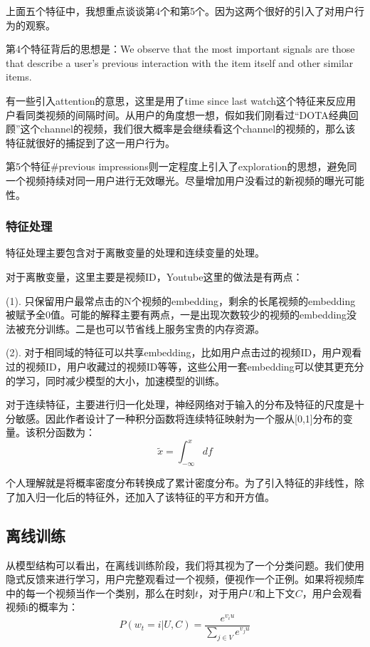 \documentclass[12pt]{article}
\begin{document}
上面五个特征中，我想重点谈谈第4个和第5个。因为这两个很好的引入了对用户行为的观察。

第4个特征背后的思想是：We observe that the most important signals are those that describe a user's previous interaction with the item itself and other similar items.

有一些引入attention的意思，这里是用了time since last watch这个特征来反应用户看同类视频的间隔时间。从用户的角度想一想，假如我们刚看过“DOTA经典回顾”这个channel的视频，我们很大概率是会继续看这个channel的视频的，那么该特征就很好的捕捉到了这一用户行为。

第5个特征\#previous impressions则一定程度上引入了exploration的思想，避免同一个视频持续对同一用户进行无效曝光。尽量增加用户没看过的新视频的曝光可能性。

\subsubsection{特征处理}
特征处理主要包含对于离散变量的处理和连续变量的处理。

对于离散变量，这里主要是视频ID，Youtube这里的做法是有两点：

(1). 只保留用户最常点击的N个视频的embedding，剩余的长尾视频的embedding被赋予全0值。可能的解释主要有两点，一是出现次数较少的视频的embedding没法被充分训练。二是也可以节省线上服务宝贵的内存资源。

(2). 对于相同域的特征可以共享embedding，比如用户点击过的视频ID，用户观看过的视频ID，用户收藏过的视频ID等等，这些公用一套embedding可以使其更充分的学习，同时减少模型的大小，加速模型的训练。


对于连续特征，主要进行归一化处理，神经网络对于输入的分布及特征的尺度是十分敏感。因此作者设计了一种积分函数将连续特征映射为一个服从[0,1]分布的变量。该积分函数为：
$$
\tilde{x} = \int_{-\infty}^{x}df
$$

个人理解就是将概率密度分布转换成了累计密度分布。为了引入特征的非线性，除了加入归一化后的特征外，还加入了该特征的平方和开方值。



\subsection{离线训练}
从模型结构可以看出，在离线训练阶段，我们将其视为了一个分类问题。我们使用隐式反馈来进行学习，用户完整观看过一个视频，便视作一个正例。如果将视频库中的每一个视频当作一个类别，那么在时刻$t$，对于用户$U$和上下文$C$，用户会观看视频i的概率为：
$$
P(w_t = i|U,C) = \frac{e^{v_iu}}{\sum_{j \in V}{e^{v_ju}}}
$$
\end{document}
